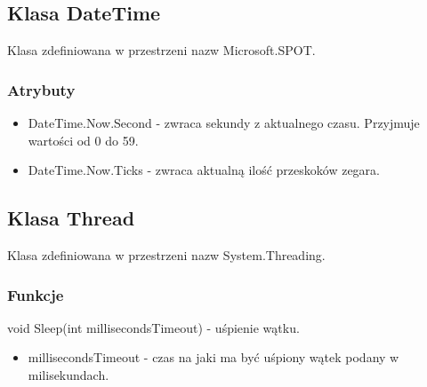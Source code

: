 \documentclass{article}
\begin{document}
\subsection{Klasa DateTime}
Klasa zdefiniowana w przestrzeni nazw Microsoft.SPOT.
\subsubsection{Atrybuty}
\begin{itemize}
\item DateTime.Now.Second - zwraca sekundy z aktualnego czasu. Przyjmuje wartości od 0 do 59.
\item DateTime.Now.Ticks - zwraca aktualną ilość przeskoków zegara. 
\end{itemize}

\subsection{Klasa Thread}
Klasa zdefiniowana w przestrzeni nazw System.Threading.
\subsubsection{Funkcje}
void Sleep(int millisecondsTimeout) - uśpienie wątku.
\begin{itemize}
\item millisecondsTimeout - czas na jaki ma być uśpiony wątek podany w milisekundach.
\end{itemize}
\end{document}
